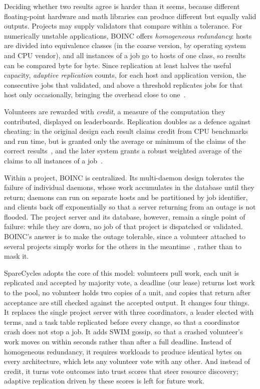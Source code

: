 Deciding whether two results agree is harder than it seems, because different floating-point hardware and math libraries can produce different but equally valid outputs. Projects may supply validators that compare within a tolerance. For numerically unstable applications, BOINC offers \emph{homogeneous redundancy}: hosts are divided into equivalence classes (in the coarse version, by operating system and CPU vendor), and all instances of a job go to hosts of one class, so results can be compared byte for byte. Since replication at least halves the useful capacity, \emph{adaptive replication} counts, for each host and application version, the consecutive jobs that validated, and above a threshold replicates jobs for that host only occasionally, bringing the overhead close to one~\cite{anderson2020boinc}.

Volunteers are rewarded with \emph{credit}, a measure of the computation they contributed, displayed on leaderboards. Replication doubles as a defence against cheating: in the original design each result claims credit from CPU benchmarks and run time, but is granted only the average or minimum of the claims of the correct results~\cite{anderson2004boinc}, and the later system grants a robust weighted average of the claims to all instances of a job~\cite{anderson2020boinc}.

Within a project, BOINC is centralized. Its multi-daemon design tolerates the failure of individual daemons, whose work accumulates in the database until they return; daemons can run on separate hosts and be partitioned by job identifier, and clients back off exponentially so that a server returning from an outage is not flooded. The project server and its database, however, remain a single point of failure: while they are down, no job of that project is dispatched or validated. BOINC's answer is to make the outage tolerable, since a volunteer attached to several projects simply works for the others in the meantime~\cite{anderson2004boinc}, rather than to mask it.

SpareCycles adopts the core of this model: volunteers pull work, each unit is replicated and accepted by majority vote, a deadline (our lease) returns lost work to the pool, no volunteer holds two copies of a unit, and copies that return after acceptance are still checked against the accepted output. It changes four things. It replaces the single project server with three coordinators, a leader elected with terms, and a task table replicated before every change, so that a coordinator crash does not stop a job. It adds SWIM gossip, so that a crashed volunteer's work moves on within seconds rather than after a full deadline. Instead of homogeneous redundancy, it requires workloads to produce identical bytes on every architecture, which lets any volunteer vote with any other. And instead of credit, it turns vote outcomes into trust scores that steer resource discovery; adaptive replication driven by these scores is left for future work.

